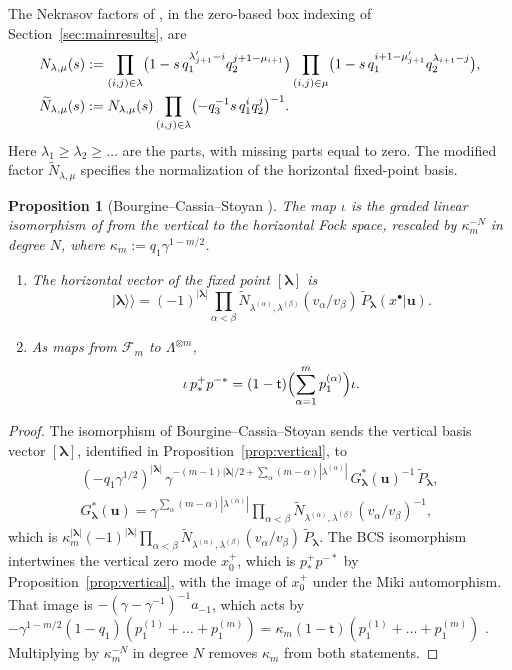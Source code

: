 \documentclass[11pt]{amsart}
\newtheorem{proposition}[theorem]{Proposition}
\theoremstyle{definition}
\theoremstyle{remark}
\newcommand{\Mt}{\mathsf t}                      %
\newcommand{\La}{\Lambda}                        %
\newcommand{\bl}{{\boldsymbol{\lambda}}}         %
\newcommand{\Fock}[1]{\mathcal F_{#1}}            %
\newcommand{\kket}[1]{\lvert #1\rangle\!\rangle} %
\newcommand{\fix}[1]{[#1]}                       %
\newcommand{\pulm}{p^{-*}}                       %
\newcommand{\pushp}{p^+_*}                       %
\newcommand{\xplus}[1]{x^+_{#1}}                 %
\newcommand{\bu}{{\mathbf u}}                    %
\newcommand{\pk}[2]{p_{#1}^{(#2)}}               %
\newcommand{\GMPn}[1]{\widetilde P_{#1}}         %
\newcommand{\Nekbare}[2]{N_{#1,#2}}              %
\newcommand{\Nek}[2]{\widetilde N_{#1,#2}}       %
\newcommand{\Hiso}{\iota}                        %
\newcommand{\kappam}[1]{\kappa_{#1}}             %
\begin{document}
The Nekrasov factors of \cite{BCS}, in the zero-based box indexing of
Section~\ref{sec:mainresults}, are
\begin{align}
 \Nekbare{\lambda}{\mu}(s)
 &:=\prod_{(i,j)\in\lambda}\bigl(1-s\,q_1^{\lambda'_{j+1}-i}q_2^{j+1-\mu_{i+1}}\bigr)
   \prod_{(i,j)\in\mu}\bigl(1-s\,q_1^{i+1-\mu'_{j+1}}q_2^{\lambda_{i+1}-j}\bigr),\notag\\
 \Nek{\lambda}{\mu}(s)
 &:=\Nekbare{\lambda}{\mu}(s)\prod_{(i,j)\in\lambda}
       \bigl(-q_3^{-1}s\,q_1^{i}q_2^{j}\bigr)^{-1}.\label{eq:nekrasovfactors}
\end{align}
Here \(\lambda_1\geq\lambda_2\geq\dots\) are the parts, with missing parts
equal to zero. The modified factor \(\Nek{\lambda}{\mu}\) specifies the
normalization of the horizontal fixed-point basis.

\begin{proposition}[{Bourgine--Cassia--Stoyan \cite{BCS}}]\label{prop:horizontal}
The map \(\Hiso\) is the graded linear isomorphism of \cite[Section~3.3]{BCS} from the
vertical to the horizontal Fock space, rescaled by \(\kappam{m}^{-N}\) in
degree \(N\), where \(\kappam{m}:=q_1\gamma^{1-m/2}\).
\begin{enumerate}
\item[(i)] The horizontal vector of the fixed point \(\fix{\bl}\) is
\begin{equation}\label{eq:kket}
 \kket{\bl}=(-1)^{|\bl|}
   \prod_{\alpha<\beta}\Nek{\lambda^{(\alpha)}}{\lambda^{(\beta)}}(v_\alpha/v_\beta)\,
   \GMPn{\bl}(x^\bullet|\bu).
\end{equation}
\item[(ii)] As maps from \(\Fock{m}\) to \(\La^{\otimes m}\),
\[
 \Hiso\,\pushp\pulm
 =(1-\Mt)\Bigl(\sum_{\alpha=1}^m\pk{1}{\alpha}\Bigr)\Hiso.
\]
\end{enumerate}
\end{proposition}

\begin{proof}
The isomorphism of Bourgine--Cassia--Stoyan \cite[Section~3.3]{BCS} sends the
vertical basis vector \(\fix{\bl}\), identified in Proposition~\ref{prop:vertical}, to
\begin{gather*}
 (-q_1\gamma^{1/2})^{|\bl|}\,
 \gamma^{-(m-1)|\bl|/2+\sum_\alpha(m-\alpha)|\lambda^{(\alpha)}|}\,
 G^*_{\bl}(\bu)^{-1}\,\GMPn{\bl},\\
 G^*_{\bl}(\bu)=\gamma^{\sum_\alpha(m-\alpha)|\lambda^{(\alpha)}|}
 \prod_{\alpha<\beta}\Nek{\lambda^{(\alpha)}}{\lambda^{(\beta)}}(v_\alpha/v_\beta)^{-1},
\end{gather*}
which is \(\kappam{m}^{|\bl|}(-1)^{|\bl|}\prod_{\alpha<\beta}
\Nek{\lambda^{(\alpha)}}{\lambda^{(\beta)}}(v_\alpha/v_\beta)\,\GMPn{\bl}\).
The BCS isomorphism intertwines the vertical zero mode \(\xplus{0}\), which is \(\pushp\pulm\) by
Proposition~\ref{prop:vertical}, with the image of \(\xplus{0}\) under the Miki
automorphism. That image is \(-(\gamma-\gamma^{-1})^{-1}a_{-1}\), which acts by
\(-\gamma^{1-m/2}(1-q_1)(\pk{1}{1}+\dots+\pk{1}{m})
=\kappam{m}(1-\Mt)(\pk{1}{1}+\dots+\pk{1}{m})\) \cite[Section~2]{BCS}.
Multiplying by \(\kappam{m}^{-N}\) in degree \(N\) removes \(\kappam{m}\) from both
statements.
\end{proof}
\end{document}
